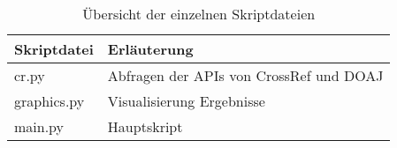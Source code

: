 \clearpage
\begin{appendices}
\label{appendix}
\begin{table}[h]
\caption{Übersicht der einzelnen Skriptdateien}
    \begin{tabularx}{1\textwidth}{p{5cm}p{9cm}}
    \toprule
     Skriptdatei & Erläuterung \\
     \midrule
cr.py & Abfragen der APIs von CrossRef und DOAJ \\
graphics.py	& Visualisierung Ergebnisse\\
main.py & Hauptskript\\
    \bottomrule
    \end{tabularx}
\end{table}


\end{appendices}
